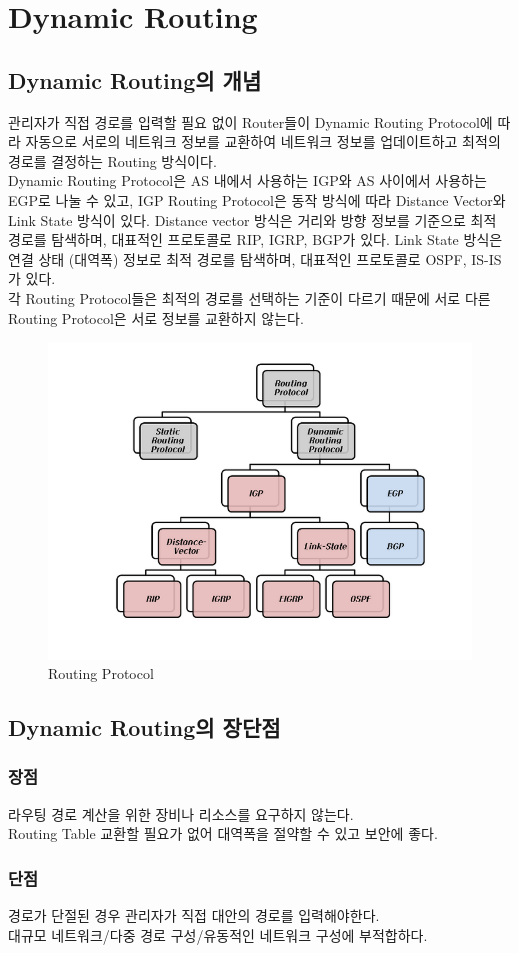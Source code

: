 \newpage
\section{Dynamic Routing}
\subsection{Dynamic Routing의 개념}
    관리자가 직접 경로를 입력할 필요 없이 Router들이 Dynamic Routing Protocol에 따라 자동으로 서로의 네트워크 정보를 교환하여 네트워크 정보를 업데이트하고 최적의 경로를 결정하는 Routing 방식이다. \\
    Dynamic Routing Protocol은 AS 내에서 사용하는 IGP와 AS 사이에서 사용하는 EGP로 나눌 수 있고, IGP Routing Protocol은 동작 방식에 따라 Distance Vector와 Link State 방식이 있다. Distance vector 방식은 거리와 방향 정보를 기준으로 최적 경로를 탐색하며, 대표적인 프로토콜로 RIP, IGRP, BGP가 있다. Link State 방식은 연결 상태 (대역폭) 정보로 최적 경로를 탐색하며, 대표적인 프로토콜로 OSPF, IS-IS가 있다. \\
    각 Routing Protocol들은 최적의 경로를 선택하는 기준이 다르기 때문에 서로 다른 Routing Protocol은 서로 정보를 교환하지 않는다. \\
    
    \vspace{-4mm}
    \begin{figure}[!h]\centering
		\includegraphics[width=.65\textwidth]{image/week06/4-1.png}
		\caption{\small Routing Protocol}
		\vspace{-10pt}
    \end{figure}
    
\subsection{Dynamic Routing의 장단점}
    \subsubsection*{장점}
    라우팅 경로 계산을 위한 장비나 리소스를 요구하지 않는다. \\
    Routing  Table 교환할 필요가 없어 대역폭을 절약할 수 있고 보안에 좋다. \\
    \subsubsection*{단점}
    경로가 단절된 경우 관리자가 직접 대안의 경로를 입력해야한다. \\
    대규모 네트워크/다중 경로 구성/유동적인 네트워크 구성에 부적합하다. \\
\newpage
